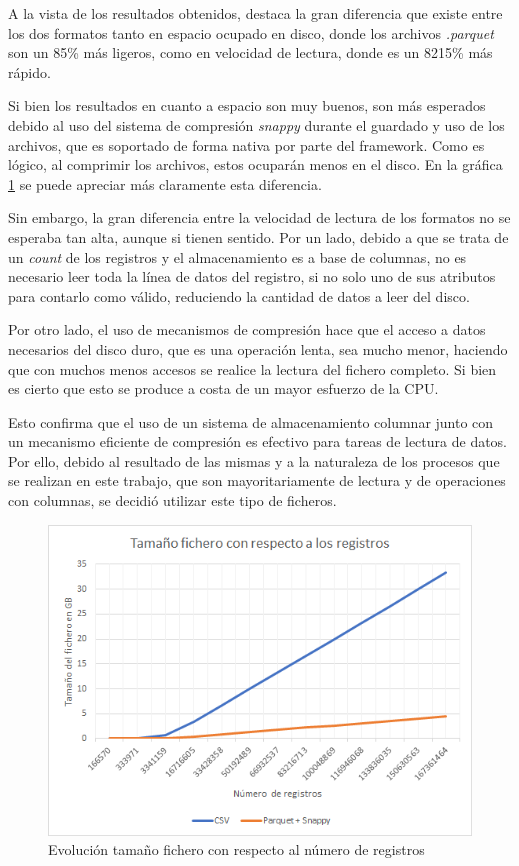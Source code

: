 A la vista de los resultados obtenidos, destaca la gran diferencia que existe entre los dos formatos tanto en espacio ocupado en disco, donde los archivos \textit{.parquet} son un 85\% más ligeros, como en velocidad de lectura, donde es un 8215\% más rápido.

Si bien los resultados en cuanto a espacio son muy buenos, son más esperados debido al uso del sistema de compresión \textit{snappy} durante el guardado y uso de los archivos, que es soportado de forma nativa por parte del \Gls{framework}. Como es lógico, al comprimir los archivos, estos ocuparán menos en el disco. En la gráfica \ref{gra:espacioFichero} se puede apreciar más claramente esta diferencia.

Sin embargo, la gran diferencia entre la velocidad de lectura de los formatos no se esperaba tan alta, aunque si tienen sentido. Por un lado, debido a que se trata de un \textit{count} de los registros y el almacenamiento es a base de columnas, no es necesario leer toda la línea de datos del registro, si no solo uno de sus atributos para contarlo como válido, reduciendo la cantidad de datos a leer del disco.

Por otro lado, el uso de mecanismos de compresión hace que el acceso a datos necesarios del disco duro, que es una operación lenta, sea mucho menor, haciendo que con muchos menos accesos se realice la lectura del fichero completo. Si bien es cierto que esto se produce a costa de un mayor esfuerzo de la \gls{CPU}.

Esto confirma que el uso de un sistema de almacenamiento columnar junto con un mecanismo eficiente de compresión es efectivo para tareas de lectura de datos. Por ello, debido al resultado de las mismas y a la naturaleza de los procesos que se realizan en este trabajo, que son mayoritariamente de lectura y de operaciones con columnas, se decidió utilizar este tipo de ficheros.

\begin{figure}[htp!]
	\centering
	\caption{Evolución tamaño fichero con respecto al número de registros}
	\label{gra:espacioFichero}
	\vspace{5pt}
	\includegraphics[scale=1]{graficas/espacioFichero}
\end{figure}

